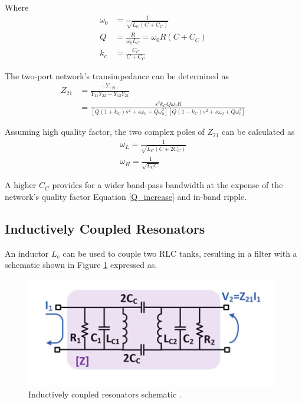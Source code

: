 Where
\begin{align}
    \omega_0&=\frac{1}{\sqrt{L_C\left (C+C_C\right)}}\\
    Q&=\frac{R}{\omega_0 L_C}=\omega_0R\left (C+C_C\right) \label{Q_increase}\\
    k_c&=\frac{C_C}{C+C_C}
\end{align}

The two-port network's transimpedance can be determined as \cite{5710437,microwave-engineering}
\begin{equation}
    \begin{split}
        Z_{21}&=\frac{-Y_[21]}{Y_{11}Y_{22}-Y_{12}Y_{21}}\\ &=\frac{s^3k_CQ\omega_0R}{\left [Q\left (1+k_C\right )s^2+s\omega_0+Q\omega_0^2\right]\left [Q\left (1-k_C\right )s^2+s\omega_0+Q\omega_0^2\right]}
    \end{split}
\end{equation}

Assuming high quality factor, the two complex poles of $Z_{21}$ can be calculated as
\begin{align}
    \omega_L=\frac{1}{\sqrt{L_C\left (C+2C_C\right )}}\\
    \omega_H=\frac{1}{\sqrt{L_CC}}
\end{align}

A higher $C_C$ provides for a wider band-pass bandwidth at the expense of the network's quality factor Equation \eqref{Q_increase} and in-band ripple.

\subsection{Inductively Coupled Resonators}
An inductor $L_c$ can be used to couple two RLC tanks, resulting in a filter with a schematic shown in Figure \ref{fig:inductively-coupled-resonators} \cite{WidebandReceiver,6942051} expressed as.

\begin{figure}[h]
    \centering
    \includegraphics{figures/capicitively-coupled-resonator.PNG}
    \caption{Inductively coupled
resonators schematic \cite{5G-and-E-band}.}
    \label{fig:inductively-coupled-resonators}
\end{figure}


